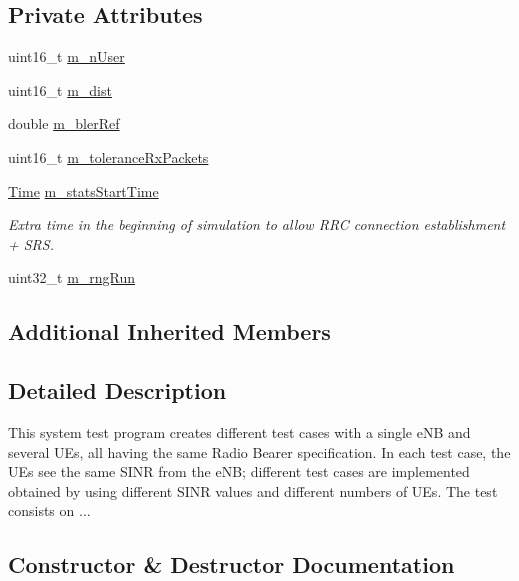 \subsection*{Private Attributes}
\begin{DoxyCompactItemize}
\item 
uint16\+\_\+t \hyperlink{classLenaDataPhyErrorModelTestCase_a7d8a550f6403ea7a365759bbbffbacb4}{m\+\_\+n\+User}
\item 
uint16\+\_\+t \hyperlink{classLenaDataPhyErrorModelTestCase_af0a143c87cace37877df80a6a04ba765}{m\+\_\+dist}
\item 
double \hyperlink{classLenaDataPhyErrorModelTestCase_ae71840486376fab393228e5cd12b46ca}{m\+\_\+bler\+Ref}
\item 
uint16\+\_\+t \hyperlink{classLenaDataPhyErrorModelTestCase_aee9e59c87518a69c4a4e9359af2bbc96}{m\+\_\+tolerance\+Rx\+Packets}
\item 
\hyperlink{classns3_1_1Time}{Time} \hyperlink{classLenaDataPhyErrorModelTestCase_aeff30e1e43b3bcda6fab63889dbe0996}{m\+\_\+stats\+Start\+Time}
\begin{DoxyCompactList}\small\item\em Extra time in the beginning of simulation to allow R\+RC connection establishment + S\+RS. \end{DoxyCompactList}\item 
uint32\+\_\+t \hyperlink{classLenaDataPhyErrorModelTestCase_a6735963eff8c54a2551a0f7c0f951a8d}{m\+\_\+rng\+Run}
\end{DoxyCompactItemize}
\subsection*{Additional Inherited Members}


\subsection{Detailed Description}
This system test program creates different test cases with a single e\+NB and several U\+Es, all having the same Radio Bearer specification. In each test case, the U\+Es see the same S\+I\+NR from the e\+NB; different test cases are implemented obtained by using different S\+I\+NR values and different numbers of U\+Es. The test consists on ... 

\subsection{Constructor \& Destructor Documentation}

